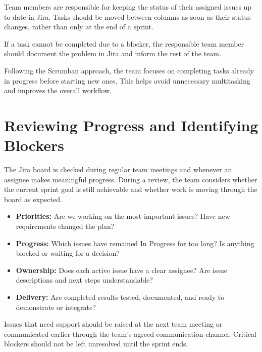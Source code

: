 \documentclass[12pt,a4paper]{article}
\begin{document}
Team members are responsible for keeping the status
of their assigned issues up to date in Jira.
Tasks should be moved between columns as soon as
their status changes, rather than only at the end
of a sprint.

If a task cannot be completed due to a blocker,
the responsible team member should document the
problem in Jira and inform the rest of the team.

Following the Scrumban approach, the team focuses
on completing tasks already in progress before
starting new ones. This helps avoid unnecessary
multitasking and improves the overall workflow.



\section{Reviewing Progress and Identifying Blockers}

The Jira board is checked during regular team meetings and whenever an
assignee makes meaningful progress. During a review, the team considers
whether the current sprint goal is still achievable and whether work is
moving through the board as expected.

\begin{itemize}
    \item \textbf{Priorities:} Are we working on the most important issues?
    Have new requirements changed the plan?
    \item \textbf{Progress:} Which issues have remained In Progress for too
    long? Is anything blocked or waiting for a decision?
    \item \textbf{Ownership:} Does each active issue have a clear assignee?
    Are issue descriptions and next steps understandable?
    \item \textbf{Delivery:} Are completed results tested, documented, and
    ready to demonstrate or integrate?
\end{itemize}

Issues that need support should be raised at the next team meeting or
communicated earlier through the team's agreed communication channel.
Critical blockers should not be left unresolved until the sprint ends.

\end{document}
